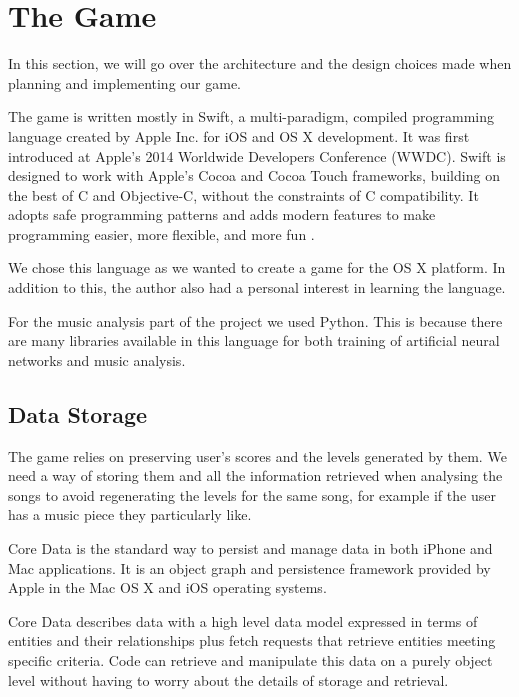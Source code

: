 \vspace{20pt}
\newpage

\section{The Game}

In this section, we will go over the architecture and the design choices made when planning and implementing our game.

The game is written mostly in Swift, a multi-paradigm, compiled programming language created by Apple Inc. for iOS and OS X development. 
It was first introduced at Apple's 2014 Worldwide Developers Conference (WWDC). Swift is designed to work with Apple's Cocoa and Cocoa Touch frameworks, building on the best of C and Objective-C, without the constraints of C compatibility. It adopts safe programming patterns and adds modern features to make programming easier, more flexible, and more fun \cite{swiftintro}. 

We chose this language as we wanted to create a game for the OS X platform. In addition to this, the author also had a personal interest in learning the language.

For the music analysis part of the project we used Python. This is because there are many libraries available in this language for both training of artificial neural networks and music analysis. 

\vspace{10pt}


\subsection{Data Storage}

The game relies on preserving user's scores and the levels generated by them. We need a way of storing them and all the information retrieved when analysing the songs to avoid regenerating the levels for the same song, for example if the user has a music piece they particularly like.

Core Data is the standard way to persist and manage data in both iPhone and Mac applications. It is an object graph and persistence framework provided by Apple in the Mac OS X and iOS operating systems. 

Core Data describes data with a high level data model expressed in terms of entities and their relationships plus fetch requests that retrieve entities meeting specific criteria. Code can retrieve and manipulate this data on a purely object level without having to worry about the details of storage and retrieval. 

